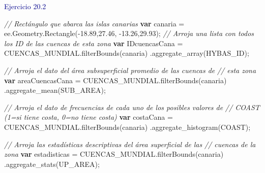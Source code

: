 \documentclass[
  12pt,
  letterpaper,
  twoside]{book}
\newenvironment{Shaded}{\begin{snugshade}}{\end{snugshade}}
\newcommand{\AttributeTok}[1]{\textcolor[rgb]{0.48,0.12,0.64}{#1}}
\newcommand{\CommentTok}[1]{\textcolor[rgb]{0.24,0.58,0.00}{\textit{#1}}}
\newcommand{\FloatTok}[1]{\textcolor[rgb]{0.28,0.53,0.93}{#1}}
\newcommand{\FunctionTok}[1]{\textcolor[rgb]{0.48,0.12,0.64}{#1}}
\newcommand{\KeywordTok}[1]{\textcolor[rgb]{0.00,0.00,0.00}{\textbf{#1}}}
\newcommand{\NormalTok}[1]{#1}
\newcommand{\OperatorTok}[1]{\textcolor[rgb]{0.00,0.00,0.00}{#1}}
\newcommand{\StringTok}[1]{\textcolor[rgb]{0.87,0.29,0.22}{#1}}
\begin{document}
\textcolor{darkblue}{Ejercicio 20.2}

\begin{Shaded}
\begin{Highlighting}[]
\CommentTok{// Rectángulo que abarca las islas canarias}
\KeywordTok{var}\NormalTok{ canaria }\OperatorTok{=}\NormalTok{ ee}\OperatorTok{.}\AttributeTok{Geometry}\OperatorTok{.}\FunctionTok{Rectangle}\NormalTok{(}\OperatorTok{{-}}\FloatTok{18.89}\OperatorTok{,}\FloatTok{27.46}\OperatorTok{,} \OperatorTok{{-}}\FloatTok{13.26}\OperatorTok{,}\FloatTok{29.93}\NormalTok{)}\OperatorTok{;} 
\CommentTok{// Arroja una lista con todos los ID de las cuencas de esta zona}
\KeywordTok{var}\NormalTok{ IDcuencasCana }\OperatorTok{=}\NormalTok{ CUENCAS\_MUNDIAL}\OperatorTok{.}\FunctionTok{filterBounds}\NormalTok{(canaria)}
\OperatorTok{.}\FunctionTok{aggregate\_array}\NormalTok{(}\StringTok{\textquotesingle{}HYBAS\_ID\textquotesingle{}}\NormalTok{)}\OperatorTok{;}

\CommentTok{// Arroja el dato del área subsuperficial promedio de las cuencas de }
\CommentTok{// esta zona}
\KeywordTok{var}\NormalTok{ areaCuencasCana }\OperatorTok{=}\NormalTok{ CUENCAS\_MUNDIAL}\OperatorTok{.}\FunctionTok{filterBounds}\NormalTok{(canaria)}
\OperatorTok{.}\FunctionTok{aggregate\_mean}\NormalTok{(}\StringTok{\textquotesingle{}SUB\_AREA\textquotesingle{}}\NormalTok{)}\OperatorTok{;}

\CommentTok{// Arroja el dato de frecuencias de cada uno de los posibles valores de}
\CommentTok{// COAST (1=si tiene costa, 0=no tiene costa)}
\KeywordTok{var}\NormalTok{ costaCana }\OperatorTok{=}\NormalTok{ CUENCAS\_MUNDIAL}\OperatorTok{.}\FunctionTok{filterBounds}\NormalTok{(canaria)}
\OperatorTok{.}\FunctionTok{aggregate\_histogram}\NormalTok{(}\StringTok{\textquotesingle{}COAST\textquotesingle{}}\NormalTok{)}\OperatorTok{;} 

\CommentTok{// Arroja las estadísticas descriptivas del área superficial de las}
\CommentTok{// cuencas de la zona}
\KeywordTok{var}\NormalTok{ estadisticas }\OperatorTok{=}\NormalTok{ CUENCAS\_MUNDIAL}\OperatorTok{.}\FunctionTok{filterBounds}\NormalTok{(canaria)}
\OperatorTok{.}\FunctionTok{aggregate\_stats}\NormalTok{(}\StringTok{\textquotesingle{}UP\_AREA\textquotesingle{}}\NormalTok{)}\OperatorTok{;} 
\end{Highlighting}
\end{Shaded}
\end{document}
